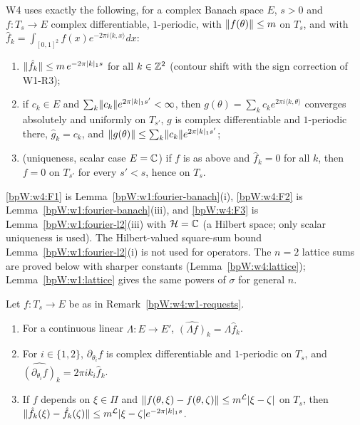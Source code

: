 \begin{remark}\label{bpW:w4:w1-requests}
W4 uses exactly the following, for a complex Banach space $E$, $s>0$ and
$f:T_s\to E$ complex differentiable, $1$-periodic, with $\lVert f(\theta)\rVert\le m$ on $T_s$, and with
$\hat f_k=\int_{[0,1]^2}f(x)e^{-2\pi i\langle k,x\rangle}dx$:
\begin{enumerate}[label=(F\arabic*),ref=(F\arabic*)]
\item\label{bpW:w4:F1} $\lVert \hat f_k\rVert\le m\,e^{-2\pi\lvert k\rvert_1s}$ for all $k\in\mathbb{Z}^2$ (contour shift with the sign
  correction of W1-R3);
\item\label{bpW:w4:F2} if $c_k\in E$ and $\sum_k\lVert c_k\rVert e^{2\pi\lvert k\rvert_1s'}<\infty$, then
  $g(\theta)=\sum_kc_ke^{2\pi i\langle k,\theta\rangle}$ converges absolutely and uniformly on $T_{s'}$, $g$ is complex
  differentiable and $1$-periodic there, $\hat g_k=c_k$, and $\lVert g(\theta)\rVert\le\sum_k\lVert c_k\rVert e^{2\pi\lvert k\rvert_1s'}$;
\item\label{bpW:w4:F3} (uniqueness, scalar case $E=\mathbb{C}$) if $f$ is as above and $\hat f_k=0$ for all $k$, then $f=0$ on
  $T_{s'}$ for every $s'<s$, hence on $T_s$.
\end{enumerate}
\ref{bpW:w4:F1} is Lemma~\ref{bpW:w1:fourier-banach}(i), \ref{bpW:w4:F2} is Lemma~\ref{bpW:w1:fourier-banach}(iii), and
\ref{bpW:w4:F3} is Lemma~\ref{bpW:w1:fourier-l2}(iii) with $\mathcal H=\mathbb{C}$ (a Hilbert space; only scalar uniqueness is
used). The Hilbert-valued square-sum bound Lemma~\ref{bpW:w1:fourier-l2}(i) is not used for operators. The
$n=2$ lattice sums are proved below with sharper constants (Lemma~\ref{bpW:w4:lattice}); Lemma~\ref{bpW:w1:lattice}
gives the same powers of $\sigma$ for general $n$.
\end{remark}

\begin{lemma}\label{bpW:w4:fourier-ops}
Let $f:T_s\to E$ be as in Remark~\ref{bpW:w4:w1-requests}.
\begin{enumerate}[label=(\roman*)]
\item For a continuous linear $\Lambda:E\to E'$, $\widehat{(\Lambda f)}_k=\Lambda\hat f_k$.
\item For $i\in\{1,2\}$, $\partial_{\theta_i}f$ is complex differentiable and $1$-periodic on $T_s$, and
  $\widehat{(\partial_{\theta_i}f)}_k=2\pi ik_i\hat f_k$.
\item If $f$ depends on $\xi\in\Pi$ and $\lVert f(\theta,\xi)-f(\theta,\zeta)\rVert\le m^{\mathcal L}\lvert \xi-\zeta\rvert$ on $T_s$,
  then $\lVert \hat f_k(\xi)-\hat f_k(\zeta)\rVert\le m^{\mathcal L}\lvert \xi-\zeta\rvert e^{-2\pi\lvert k\rvert_1s}$.
\end{enumerate}
\end{lemma}

